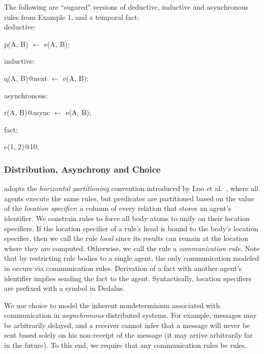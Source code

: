 \begin{example}
The following are ``sugared" versions of deductive, inductive and asynchronous rules from Example 1, and a temporal fact:
\\
deductive:
\begin{Dedalus}
p(A, B) \(\leftarrow\) e(A, B);
\end{Dedalus}
inductive:
\begin{Dedalus}
q(A, B)@next \(\leftarrow\) e(A, B);
\end{Dedalus}
asynchronous:
\begin{Dedalus}
r(A, B)@async \(\leftarrow\) e(A, B);
\end{Dedalus}
fact:
\begin{Dedalus}
e(1, 2)@10;
\end{Dedalus}

\end{example}

\subsubsection{Distribution, Asynchrony and Choice}

\lang adopts the {\em horizontal partitioning} convention introduced by Loo et
al.~\cite{Loo:2005}, where all agents execute the same rules, but predicates
are partitioned based on the value of the {\em location specifier}: a column of
every relation that stores an agent's identifier.  We constrain \lang rules to
force all body atoms to unify on their location specifiers.  If the location
specifier of a rule's head is bound to the body's location specifier, then we
call the rule {\em local} since its results can remain at the location where
they are computed.  Otherwise, we call the rule a {\em communication rule}.
Note that by restricting rule bodies to a single agent, the only communication
modeled in \lang occurs via communication rules.  Derivation of a fact with
another agent's identifier implies sending the fact to the agent.
Syntactically, location specifiers are prefixed with a \dedalus{\#} symbol in
Dedalus.

We use choice to model the inherent nondeterminism associated with
communication in {\em asynchronous} distributed systems.  For example, messages
may be arbitrarily delayed, and a receiver cannot infer that a message will
never be sent based solely on his non-receipt of the message (it may arrive
arbitrarily far in the future).
To this end, we require that any communication rules be  rules.

